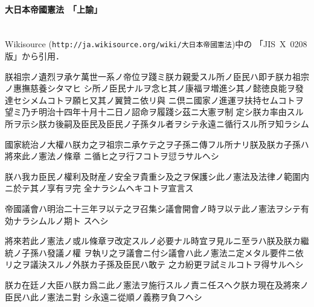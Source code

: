 \documentclass{ltjsarticle}
\begin{document}
\paragraph{大日本帝國憲法　「上諭」}\ \\
Wikisource (\texttt{http://ja.wikisource.org/wiki/大日本帝國憲法})中の
「JIS~X~0208版」から引用．

\medskip

{\selectfont
朕祖宗ノ遺烈ヲ承ケ萬世一系ノ帝位ヲ踐ミ朕カ親愛スル所ノ臣民ハ即チ朕カ祖宗ノ惠撫慈養シタマヒ
シ所ノ臣民ナルヲ念ヒ其ノ康福ヲ増進シ其ノ懿徳良能ヲ發達セシメムコトヲ願ヒ又其ノ翼贊ニ依リ與
ニ倶ニ國家ノ進運ヲ扶持セムコトヲ望ミ乃チ明治十四年十月十二日ノ詔命ヲ履踐シ茲ニ大憲ヲ制
定シ朕カ率由スル所ヲ示シ朕カ後嗣及臣民及臣民ノ子孫タル者ヲシテ永遠ニ循行スル所ヲ知ラシム

國家統治ノ大權ハ朕カ之ヲ祖宗ニ承ケテ之ヲ子孫ニ傳フル所ナリ朕及朕カ子孫ハ將來此ノ憲法ノ條章
ニ循ヒ之ヲ行フコトヲ愆ラサルヘシ

朕ハ我カ臣民ノ權利及財産ノ安全ヲ貴重シ及之ヲ保護シ此ノ憲法及法律ノ範圍内ニ於テ其ノ享有ヲ完
全ナラシムヘキコトヲ宣言ス

帝國議會ハ明治二十三年ヲ以テ之ヲ召集シ議會開會ノ時ヲ以テ此ノ憲法ヲシテ有効ナラシムルノ期ト
スヘシ

將來若此ノ憲法ノ或ル條章ヲ改定スルノ必要ナル時宜ヲ見ルニ至ラハ朕及朕カ繼統ノ子孫ハ發議ノ權
ヲ執リ之ヲ議會ニ付シ議會ハ此ノ憲法ニ定メタル要件ニ依リ之ヲ議決スルノ外朕カ子孫及臣民ハ敢テ
之カ紛更ヲ試ミルコトヲ得サルヘシ

朕カ在廷ノ大臣ハ朕カ爲ニ此ノ憲法ヲ施行スルノ責ニ任スヘク朕カ現在及將來ノ臣民ハ此ノ憲法ニ對
シ永遠ニ從順ノ義務ヲ負フヘシ
}
\end{document}
